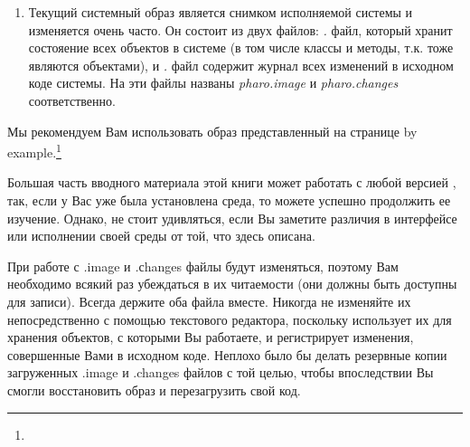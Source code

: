 \documentclass[a4paper,10pt,twoside]{book}
\begin{document}
\begin{enumerate}
\item Текущий системный образ является снимком исполняемой системы
и изменяется очень часто. Он состоит из двух файлов: \emph{.}
 файл, который хранит состояение всех объектов в
системе (в том числе классы и методы, т.к. тоже являются объектами),
и \emph{.} файл содержит журнал всех изменений
в исходном коде системы. На  эти файлы названы
\emph{pharo.image} и \emph{pharo.changes} соответственно.

\end{enumerate}


Мы рекомендуем Вам использовать образ представленный на странице
\pharo by example.\footnote{\pbe}



Большая часть вводного материала этой книги может работать
с любой версией \pharo,  так, если у Вас уже была установлена среда,
то можете успешно продолжить ее изучение. Однако,
не стоит удивляться, если Вы заметите различия в интерфейсе или
исполнении своей среды от той, что здесь описана. 


При работе с \pharo  \emph{.}image и \emph{.}сhanges  файлы будут
изменяться, поэтому Вам необходимо  всякий раз убеждаться
в их читаемости (они должны быть доступны для записи).
Всегда держите оба файла вместе. Никогда не
изменяйте  их непосредственно с помощью текстового редактора,
поскольку \pharo использует их для хранения объектов,
с которыми Вы работаете,  и регистрирует изменения,
совершенные Вами в исходном коде.  Неплохо было бы делать резервные
копии загруженных .image и .changes файлов с той целью,
чтобы впоследствии Вы смогли восстановить образ и
перезагрузить свой код. 
\end{document}
